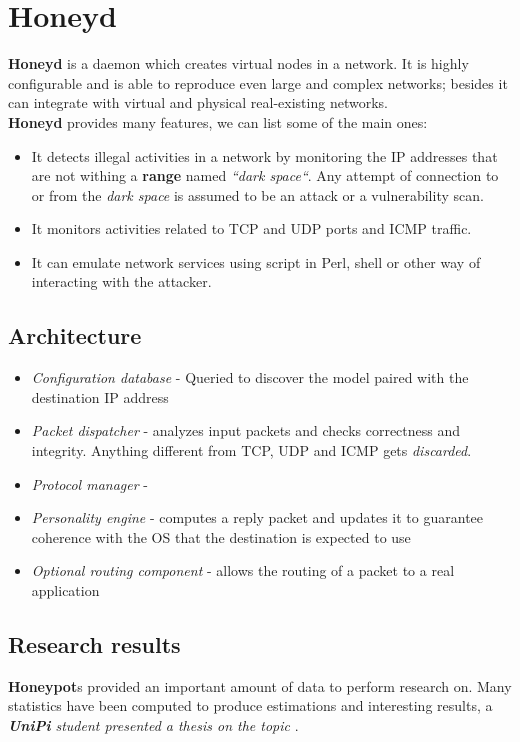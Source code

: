 \section{Honeyd}
\textbf{Honeyd} is a daemon which creates virtual nodes in a network.
It is highly configurable and is able to reproduce even large and complex networks;
besides it can integrate with virtual and physical real-existing networks.\\
\textbf{Honeyd} provides many features, we can list some of the main ones:
\begin{itemize}
   \item It detects illegal activities in a network by monitoring the IP addresses that are not withing a \textbf{range} named \textit{“dark space“}.
   Any attempt of connection to or from the \textit{dark space} is assumed to be an attack or a vulnerability scan.
   \item It monitors activities related to TCP and UDP ports and ICMP traffic.
   \item It can emulate network services using script in Perl, shell or other way of interacting with the attacker.
\end{itemize}

\subsection{Architecture}
\begin{itemize}
   \item \textit{Configuration database} -
   Queried to discover the model paired with the destination IP address
   \item \textit{Packet dispatcher} -
   analyzes input packets and checks correctness and integrity.
   Anything different from TCP, UDP and ICMP gets \textit{discarded}.
   \item \textit{Protocol manager} -

   \item \textit{Personality engine} -
   computes a reply packet and updates it to guarantee coherence with the OS that the destination is expected to use
   \item \textit{Optional routing component} -
   allows the routing of a packet to a real application
\end{itemize}

\subsection{Research results}
\textbf{Honeypot}s provided an important amount of data to perform research on.
Many statistics have been computed to produce estimations and interesting results,
a \textit{\textbf{UniPi} student presented a thesis on the topic} \smiley.
